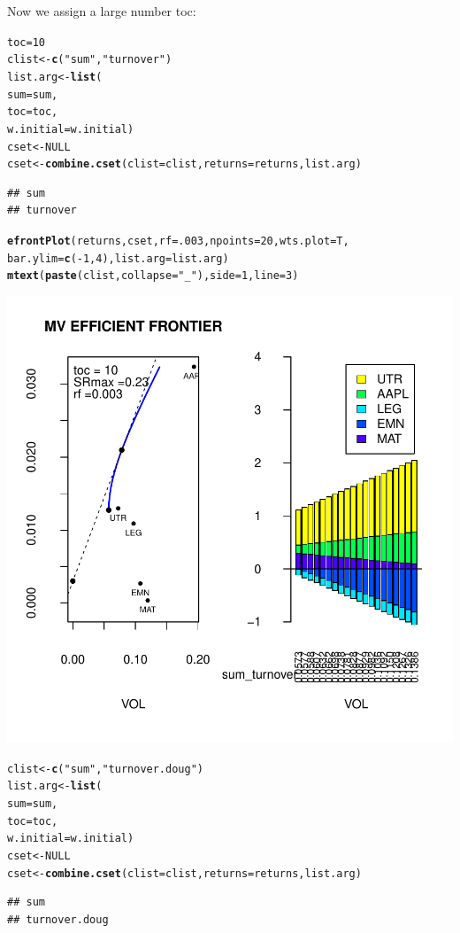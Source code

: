 \documentclass{uwstat518}\usepackage[]{graphicx}\usepackage[]{color}
\makeatletter
\def\maxwidth{ %
  \ifdim\Gin@nat@width>\linewidth
    \linewidth
  \else
    \Gin@nat@width
  \fi
}
\newcommand{\hlstr}[1]{\textcolor[rgb]{0.192,0.494,0.8}{#1}}%
\newcommand{\hlkwd}[1]{\textcolor[rgb]{0.737,0.353,0.396}{\textbf{#1}}}%
\newenvironment{kframe}{%
 \def\at@end@of@kframe{}%
 \ifinner\ifhmode%
  \def\at@end@of@kframe{\end{minipage}}%
  \begin{minipage}{\columnwidth}%
 \fi\fi%
 \def\FrameCommand##1{\hskip\@totalleftmargin \hskip-\fboxsep
 \colorbox{shadecolor}{##1}\hskip-\fboxsep
     \hskip-\linewidth \hskip-\@totalleftmargin \hskip\columnwidth}%
 \MakeFramed {\advance\hsize-\width
   \@totalleftmargin\z@ \linewidth\hsize
   \@setminipage}}%
 {\par\unskip\endMakeFramed%
 \at@end@of@kframe}
\newenvironment{knitrout}{}{} %
\makeatother
\begin{document}
Now we assign a large number toc:
\begin{knitrout}
\color{fgcolor}\begin{kframe}
\begin{alltt}
toc=10
clist <- \hlkwd{c}(\hlstr{"sum"},\hlstr{"turnover"})
list.arg <- \hlkwd{list}(	
		sum=sum,
		toc=toc,
		w.initial=w.initial)
cset <- NULL
cset <-\hlkwd{combine.cset}(clist=clist,returns=returns,list.arg)
\end{alltt}
\begin{verbatim}
## sum 
## turnover
\end{verbatim}
\begin{alltt}
\hlkwd{efrontPlot}(returns, cset, rf = .003, npoints = 20,wts.plot = T,
		bar.ylim = \hlkwd{c}(-1,4),list.arg=list.arg)
\hlkwd{mtext}(\hlkwd{paste}(clist,collapse=\hlstr{"_"}),side=1,line=3)
\end{alltt}
\end{kframe}
\includegraphics[width=\maxwidth]{figure/unnamed-chunk-71} 
\begin{kframe}\begin{alltt}

clist <- \hlkwd{c}(\hlstr{"sum"},\hlstr{"turnover.doug"})
list.arg <- \hlkwd{list}(	
		sum=sum,
		toc=toc,
		w.initial=w.initial)
cset <- NULL
cset <-\hlkwd{combine.cset}(clist=clist,returns=returns,list.arg)
\end{alltt}
\begin{verbatim}
## sum 
## turnover.doug
\end{verbatim}
\begin{alltt}


\end{alltt}
\end{kframe}
\end{knitrout}
\end{document}
